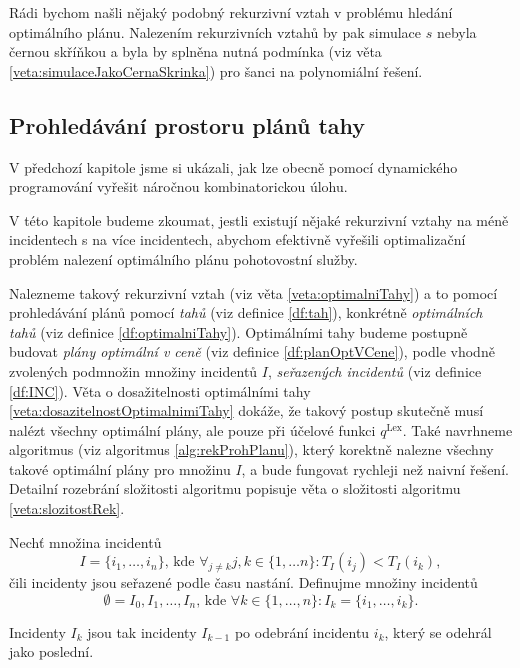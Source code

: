 Rádi bychom našli nějaký podobný rekurzivní vztah v problému hledání optimálního plánu.
Nalezením rekurzivních vztahů by pak simulace $s$ nebyla černou skříňkou a byla by splněna nutná podmínka (viz věta \ref{veta:simulaceJakoCernaSkrinka}) pro šanci na polynomiální řešení.

\subsection{Prohledávání prostoru plánů tahy}

V předchozí kapitole jsme si ukázali, jak lze obecně pomocí dynamického programování
vyřešit náročnou kombinatorickou úlohu.

V této kapitole budeme zkoumat, jestli existují nějaké rekurzivní vztahy 
 na méně incidentech s  na více incidentech, abychom efektivně vyřešili optimalizační problém nalezení optimálního plánu pohotovostní služby. 

Nalezneme takový rekurzivní vztah (viz věta \ref{veta:optimalniTahy}) a to pomocí prohledávání plánů pomocí \textit{tahů} (viz definice \ref{df:tah}),
konkrétně \textit{optimálních tahů} (viz definice \ref{df:optimalniTahy}).
Optimálními tahy budeme postupně budovat \textit{plány optimální v ceně} (viz definice \ref{df:planOptVCene}),
podle vhodně zvolených podmnožin množiny incidentů $I$, \textit{seřazených incidentů} (viz definice \ref{df:INC}).
Věta o dosažitelnosti optimálními tahy \ref{veta:dosazitelnostOptimalnimiTahy} dokáže, že takový postup skutečně musí nalézt všechny optimální plány, ale pouze při účelové funkci $q^{\text{Lex}}$.
Také navrhneme algoritmus (viz algoritmus \ref{alg:rekProhPlanu}),
který korektně nalezne všechny takové optimální plány pro množinu $I$, a bude fungovat rychleji než naivní řešení.
Detailní rozebrání složitosti algoritmu popisuje věta o složitosti algoritmu \ref{veta:slozitostRek}.

\begin{definice}\label{df:INC}
  Nechť množina incidentů 
  \begin{equation*}
    I = \{ i_1, \dots , i_n \} \text{, kde } \forall_{j \not = k} j, k \in \{ 1, \dots n\} \colon T_I(i_j) < T_I(i_k),
  \end{equation*}
  čili incidenty jsou seřazené podle času nastání.
  Definujme množiny incidentů
  \begin{equation*}
    \emptyset = I_0, I_1, \dots, I_n \text{, kde } \forall k \in \{ 1, \dots, n \} \colon I_k = \{ i_1, \dots, i_k \}.
  \end{equation*}

  Incidenty $I_k$ jsou tak incidenty $I_{k-1}$ po odebrání incidentu $i_k$, který se odehrál jako poslední.
\end{definice}

